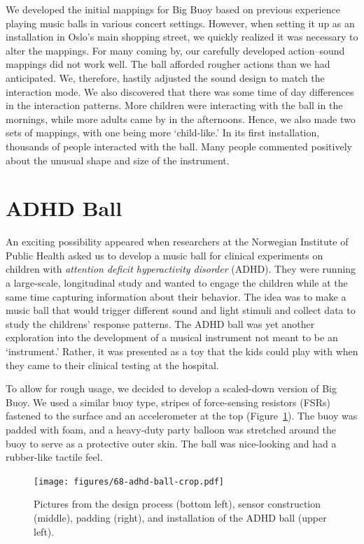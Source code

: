We developed the initial mappings for Big Buoy based on previous experience playing music balls in various concert settings. However, when setting it up as an installation in Oslo's main shopping street, we quickly realized it was necessary to alter the mappings. For many coming by, our carefully developed action--sound mappings did not work well. The ball afforded rougher actions than we had anticipated. We, therefore, hastily adjusted the sound design to match the interaction mode. We also discovered that there was some time of day differences in the interaction patterns. More children were interacting with the ball in the mornings, while more adults came by in the afternoons. Hence, we also made two sets of mappings, with one being more `child-like.' In its first installation, thousands of people interacted with the ball. Many people commented positively about the unusual shape and size of the instrument.


\section{ADHD Ball} \label{sect:adhd}

An exciting possibility appeared when researchers at the Norwegian Institute of Public Health asked us to develop a music ball for clinical experiments on children with \emph{attention deficit hyperactivity disorder} (ADHD). They were running a large-scale, longitudinal study and wanted to engage the children while at the same time capturing information about their behavior. The idea was to make a music ball that would trigger different sound and light stimuli and collect data to study the childrens' response patterns. The ADHD ball was yet another exploration into the development of a musical instrument not meant to be an `instrument.' Rather, it was presented as a toy that the kids could play with when they came to their clinical testing at the hospital.

To allow for rough usage, we decided to develop a scaled-down version of Big Buoy. We used a similar buoy type, stripes of force-sensing resistors (FSRs) fastened to the surface and an accelerometer at the top (Figure~\ref{fig:figures_ADHD-ball}).
The buoy was padded with foam, and a heavy-duty party balloon was stretched around the buoy to serve as a protective outer skin. The ball was nice-looking and had a rubber-like tactile feel.

\begin{figure}[tbp]
	\centering
		\texttt{[image: figures/68-adhd-ball-crop.pdf]}
	\caption{Pictures from the design process (bottom left), sensor construction (middle), padding (right), and installation of the ADHD ball (upper left).}
	\label{fig:figures_ADHD-ball}
\end{figure}


